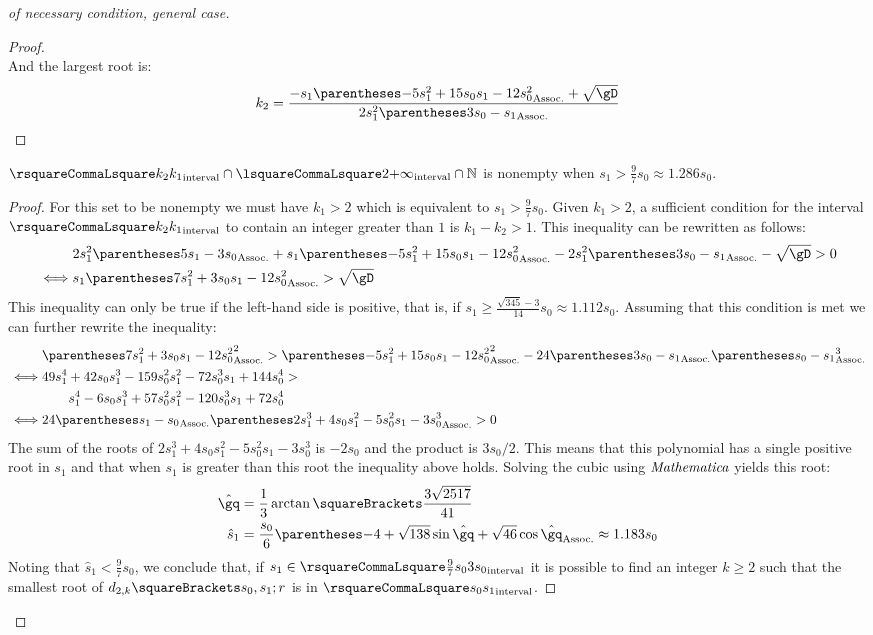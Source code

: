 \documentclass[10pt, a4paper, twoside]{basestyle}
\begin{document}
\begin{proof}[of necessary condition, general case]
\begin{claim}
\begin{proof}
\[\]
And the largest root is:
\[
k_2 = \frac{-s_1\pa{-5s_1^2 + 15 s_0 s_1 - 12s_0^2} + \sqrt{\gD}}{2s_1^2\pa{3s_0-s_1}}
\]
\end{proof}
\end{claim}
\begin{claim}
$\intopen{k_2}{k_1}\Intersection\intclop{2}{+\infty}\Intersection{\Naturals}$ is nonempty when $s_1>\frac{9}{7}s_0 \approx 1.286s_0$.
\begin{proof}
For this set to be nonempty we must have $k_1>2$ which is equivalent to $s_1>\frac{9}{7}s_0$.  Given $k_1>2$, a sufficient condition for the interval $\intopen{k_2}{k_1}$ to contain an integer greater than $1$ is $k_1-k_2>1$.  This inequality can be rewritten as follows:
\begin{align*}
&2s_1^2\pa{5s_1-3s_0} + s_1\pa{-5s_1^2 + 15 s_0 s_1 - 12s_0^2} - 2s_1^2\pa{3s_0-s_1} - \sqrt{\gD} > 0 \\
\iff &s_1\pa{7s_1^2 + 3 s_0 s_1 - 12s_0^2} > \sqrt{\gD}
\end{align*}
This inequality can only be true if the left-hand side is positive, that is, if $s_1 ≥ \frac{\sqrt{345}-3}{14}s_0 \approx 1.112s_0$.  Assuming that this condition is met we can further rewrite the inequality:
\begin{align*}
&\pa{7s_1^2 + 3 s_0 s_1 - 12s_0^2}^2 > \pa{-5s_1^2 + 15 s_0 s_1 - 12s_0^2}^2 - 24\pa{3s_0-s_1}\pa{s_0-s_1}^3 \\
\iff &49s_1^4 + 42 s_0 s_1^3 - 159 s_0^2 s_1^2 - 72 s_0^3 s_1 + 144 s_0^4 > \\
&\qquad s_1^4 - 6 s_0 s_1^3 + 57 s_0^2 s_1^2 - 120 s_0^3 s_1 + 72 s_0^4 \\
\iff &24\pa{s_1-s_0}\pa{2s_1^3 + 4 s_0 s_1^2 - 5 s_0^2 s_1 - 3s_0^3} > 0
\end{align*}
The sum of the roots of $2s_1^3 + 4 s_0 s_1^2 - 5 s_0^2 s_1 - 3s_0^3$ is $-2s_0$ and the product is $3s_0/2$.  This means that this polynomial has a single positive root in $s_1$ and that when $s_1$ is greater than this root the inequality above holds.  Solving the cubic using $\emph{Mathematica}$ yields this root:
\begin{align*}
\hat\gq &= \frac{1}{3} \arctan\of{\frac{3 \sqrt{2517}}{41}} \\
\hat{s}_1 &= \frac{s_0}{6}\pa{-4+\sqrt{138}\sin\hat\gq + \sqrt{46}\cos\hat\gq} \approx 1.183s_0
\end{align*}
Noting that $\hat{s}_1<\frac{9}{7}s_0$, we conclude that, if $s_1 \in \intopen{\frac{9}{7}s_0}{3s_0}$ it is possible to find an integer $k≥2$ such that the smallest root of $d_{2,k}\of{s_0, s_1; r}$ is in $\intopen{s_0} {s_1}$.
\end{proof}
\end{claim}
\end{proof}
\end{document}
